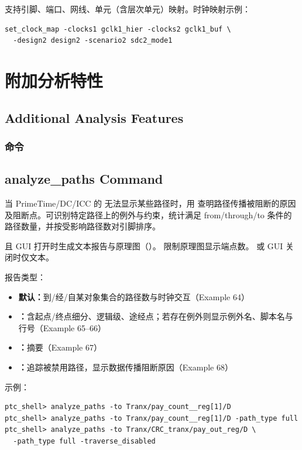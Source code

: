 支持引脚、端口、网线、单元（含层次单元）映射。时钟映射示例：
\begin{lstlisting}
set_clock_map -clocks1 gclk1_hier -clocks2 gclk1_buf \
  -design2 design2 -scenario2 sdc2_mode1
\end{lstlisting}

\section{附加分析特性}
\subsection*{Additional Analysis Features}

\subsubsection{ 命令}
\subsection*{analyze\_paths Command}

当 PrimeTime/DC/ICC 的  无法显示某些路径时，用  查明路径传播被阻断的原因及阻断点。可识别特定路径上的例外与约束，统计满足 from/through/to 条件的路径数量，并按受影响路径数对引脚排序。

 且 GUI 打开时生成文本报告与原理图（）。 限制原理图显示端点数。 或 GUI 关闭时仅文本。

报告类型：
\begin{itemize}
  \item \textbf{默认：}到/经/自某对象集合的路径数与时钟交互（Example 64）
  \item \textbf{：}含起点/终点细分、逻辑级、途经点；若存在例外则显示例外名、脚本名与行号（Example 65--66）
  \item \textbf{\cmd{-path\_type summary}：}摘要（Example 67）
  \item \textbf{：}追踪被禁用路径，显示数据传播阻断原因（Example 68）
\end{itemize}

示例：
\begin{lstlisting}
ptc_shell> analyze_paths -to Tranx/pay_count__reg[1]/D
ptc_shell> analyze_paths -to Tranx/pay_count__reg[1]/D -path_type full
ptc_shell> analyze_paths -to Tranx/CRC_tranx/pay_out_reg/D \
  -path_type full -traverse_disabled
\end{lstlisting}

